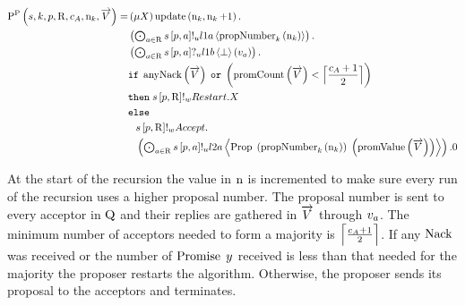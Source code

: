 \begin{align*}
\Pp{
    \SessionChannel,
    \ProcessIndexK,
    \ProposerRole,
    \QRoles,
    \AcceptorCount,
    \NumberRegister_{\ProcessIndexK},
    \VectorV
} =
&
    \Mu{\RecursionVariable}
    \update{\NumberRegister_{\ProcessIndexK}}{\NumberRegister_{\ProcessIndexK} + 1} .\\
&
    \DotForall{
       \AcceptorRole \in \QRoles
    }{
        \SendUnreliableP{\SessionChannel}{\ProposerRole}{\AcceptorRole}{\LOneA}{\proposalNumber{\NumberRegister_{\ProcessIndexK}}{\ProcessIndexK}}
    }.\\
&
    \DotForall{
        \AcceptorRole \in \QRoles
    }{
        \ReceiveUnreliableP{\SessionChannel}{\ProposerRole}{\AcceptorRole}{\LOneB}{\bot}{v_{\AcceptorRole}}
    } .\\
&
    \mIf 
        \anyNack{\VectorV}
        \tOr
        \Paren{\promiseCount{\VectorV} < \ceil{\frac{\AcceptorCount + 1}{2}}}
    \\
&
    \mThen \mSendWeaklyP{\SessionChannel}{\ProposerRole}{\QRoles}{\Restart}.
    \RecursionVariable\\
&
    \mElse\\
&\Indent{1}
    \mSendWeaklyP{\SessionChannel}{\ProposerRole}{\QRoles}{\Accept}.\\
&\Indent{1}
    \DotForall{\AcceptorRole \in \QRoles}{
        \SendUnreliableP{\SessionChannel}{\ProposerRole}{\AcceptorRole}{\LTwoA}{
            \ProposalC{
                \Paren{\proposalNumber{\NumberRegister_{\ProcessIndexK}}{\ProcessIndexK}}
            }{
                \Paren{\promiseValue{\VectorV}}
            }
        }
    }
    .\End
\end{align*}

At the start of the recursion the value in $\operatorname{n}$ is incremented to make sure every run of the recursion uses a higher proposal number.
The proposal number is sent to every acceptor in $\operatorname{Q}$ and their replies are gathered in $\overrightarrow{V}$ through $v_{a}$.
The minimum number of acceptors needed to form a majority is $\Big\lceil \frac{c_A + 1}{2} \Big\rceil$.
If any $\operatorname{Nack}$ was received or the number of $\operatorname{Promise}\; y$ received is less than that needed for the majority the proposer restarts the algorithm.
Otherwise, the proposer sends its proposal to the acceptors and terminates.

